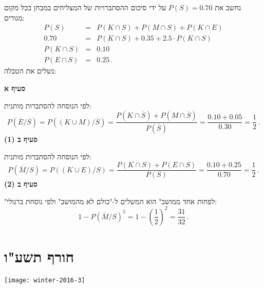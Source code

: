 נחשב את 
$P(S)=0.70$
על ידי סיכום ההסתברויות של המצליחים במבחן בכל מקום מגורים:
\begin{eqnarray*}
P(S)&=&P(K\cap S)+P(M \cap S) + P(K\cap E)\\
0.70&=&P(K\cap S)+ 0.35 + 2.5\cdot P(K\cap S)\\
P(K\cap S)&=&0.10\\
P(E\cap S)&=&0.25\,.
\end{eqnarray*}
נשלים את הטבלה:
\begin{center}
\end{center}
\textbf{סעיף א}

לפי הנוסחה להסתברות מותנית:
\[
P(\overline{E}/\overline{S})=P((K\cup M)/\overline{S}) = \frac{P(K\cap \overline{S})+P(M\cap \overline{S})}{P(\overline{S})}=\frac{0.10+0.05}{0.30}=\frac{1}{2}\,.
\]
\textbf{(1) סעיף ב}

לפי הנוסחה להסתברות מותנית:
\[
P(\overline{M}/S)=P((K\cup E)/S) = \frac{P(K\cap S)+P(E\cap S)}{P(S)}=\frac{0.10+0.25}{0.70}=\frac{1}{2}\,.
\]
\textbf{(2) סעיף ב}

"לפחות אחד ממושב" הוא המשלים ל-"כולם לא מהמושב" ולפי נוסחת ברנולי:
\[
1-P(\overline{M}/S)^5=1-\left(\frac{1}{2}\right)^2=\frac{31}{32}\,.
\]


\section{חורף תשע"ו}

\begin{center}
\texttt{[image: winter-2016-3]}
\end{center}

